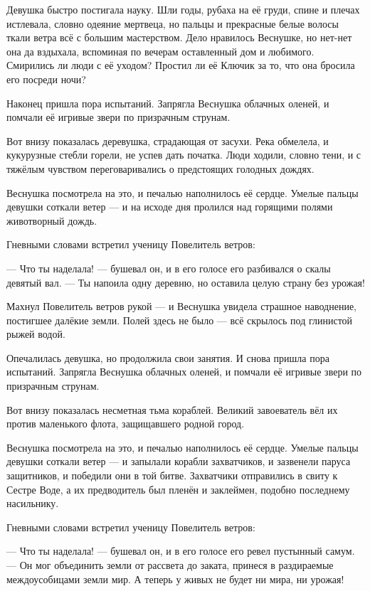 Девушка быстро постигала науку.
Шли годы, рубаха на её груди, спине и плечах истлевала, словно одеяние мертвеца, но пальцы и прекрасные белые волосы ткали ветра всё с большим мастерством.
Дело нравилось Веснушке, но нет-нет она да вздыхала, вспоминая по вечерам оставленный дом и любимого.
Смирились ли люди с её уходом? Простил ли её Ключик за то, что она бросила его посреди ночи?

Наконец пришла пора испытаний.
Запрягла Веснушка облачных оленей, и помчали её игривые звери по призрачным струнам.

Вот внизу показалась деревушка, страдающая от засухи.
Река обмелела, и кукурузные стебли горели, не успев дать початка.
Люди ходили, словно тени, и с тяжёлым чувством переговаривались о предстоящих голодных дождях.

Веснушка посмотрела на это, и печалью наполнилось её сердце.
Умелые пальцы девушки соткали ветер --- и на исходе дня пролился над горящими полями животворный дождь.

Гневными словами встретил ученицу Повелитель ветров:

--- Что ты наделала! --- бушевал он, и в его голосе его разбивался о скалы девятый вал.
--- Ты напоила одну деревню, но оставила целую страну без урожая!

Махнул Повелитель ветров рукой --- и Веснушка увидела страшное наводнение, постигшее далёкие земли.
Полей здесь не было --- всё скрылось под глинистой рыжей водой.

Опечалилась девушка, но продолжила свои занятия.
И снова пришла пора испытаний.
Запрягла Веснушка облачных оленей, и помчали её игривые звери по призрачным струнам.

Вот внизу показалась несметная тьма кораблей.
Великий завоеватель вёл их против маленького флота, защищавшего родной город.

Веснушка посмотрела на это, и печалью наполнилось её сердце.
Умелые пальцы девушки соткали ветер --- и запылали корабли захватчиков, и зазвенели паруса защитников, и победили они в той битве.
Захватчики отправились в свиту к Сестре Воде, а их предводитель был пленён и заклеймен, подобно последнему насильнику.

Гневными словами встретил ученицу Повелитель ветров:

--- Что ты наделала! --- бушевал он, и в его голосе его ревел пустынный самум.
--- Он мог объединить земли от рассвета до заката, принеся в раздираемые междоусобицами земли мир.
А теперь у живых не будет ни мира, ни урожая!


